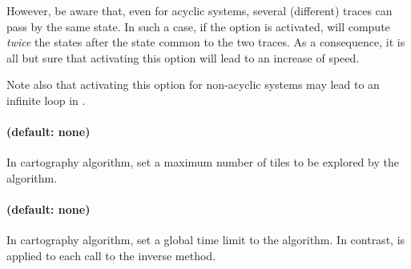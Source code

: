 However, be aware that, even for acyclic systems, several (different) traces can pass by the same state.
In such a case, if the  option is activated, \imitator{} will compute \emph{twice} the states after the state common to the two traces.
As a consequence, it is all but sure that activating this option will lead to an increase of speed.

Note also that activating this option for non-acyclic systems may lead to an infinite loop in \imitator{}.


\paragraph{ (default: none)}

In cartography algorithm, set a maximum number of tiles to be explored by the algorithm.


\paragraph{ (default: none)}

In cartography algorithm, set a global time limit to the algorithm.
In contrast,  is applied to each call to the inverse method.


%
%
%
%
%


